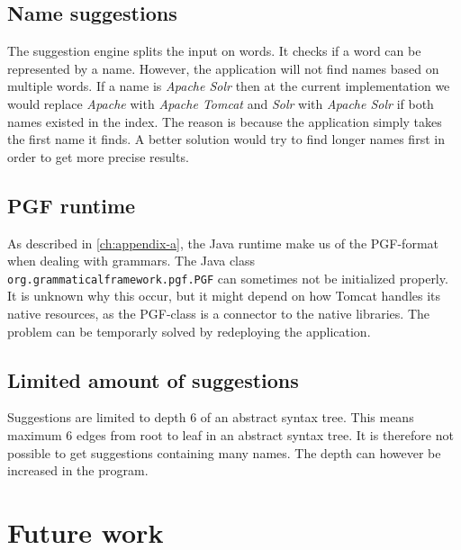 \subsection*{Name suggestions}
The suggestion engine splits the input on words. It checks if a word can be represented by a name. However, the application will not find names based on multiple words. If a name is \emph{Apache Solr} then at the current implementation we would replace \emph{Apache} with \emph{Apache Tomcat} and \emph{Solr} with \emph{Apache Solr} if both names existed in the index. The reason is because the application simply takes the first name it finds. A better solution would try to find longer names first in order to get more precise results.

\subsection*{PGF runtime}
As described in \autoref{ch:appendix-a}, the Java runtime make us of the PGF-format when dealing with grammars. The Java class \texttt{org.grammaticalframework.pgf.PGF} can sometimes not be initialized properly. It is unknown why this occur, but it might depend on how Tomcat handles its native resources, as the PGF-class is a connector to the native libraries. The problem can be temporarly solved by redeploying the application.

\subsection*{Limited amount of suggestions}
Suggestions are limited to depth 6 of an abstract syntax tree. This means maximum 6 edges from root to leaf in an abstract syntax tree. It is therefore not possible to get suggestions containing many names. The depth can however be increased in the program.

\section{Future work}

